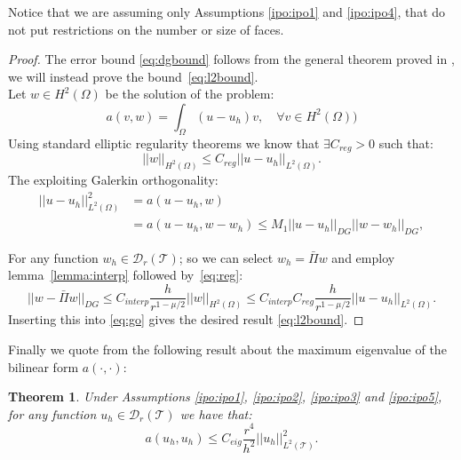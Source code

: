 \documentclass[12pt, a4paper]{article}
\theoremstyle{definition}
\theoremstyle{plain}
\theoremstyle{plain}
\newtheorem{teor}{Theorem}
\begin{document}
Notice that we are assuming only Assumptions \ref{ipo:ipo1} and \ref{ipo:ipo4}, that do not put restrictions on the number or size of faces.
\begin{proof}
	The error bound \eqref{eq:dgbound} follows from the general theorem proved in \cite{hpmet}, we will instead prove the bound~\eqref{eq:l2bound}.\\
	Let $w \in H^2(\Omega)$ be the solution of the problem:
	\begin{equation*}
		a(v, w) = \int_{\Omega} (u-u_h)v, \quad \forall v \in  H^2(\Omega))
	\end{equation*}
	Using standard elliptic regularity theorems we know that $\exists C_{reg}>0$ such that:
	\begin{equation} \label{eq:reg}
		|\!| w |\!|_{H^2(\Omega)} \leq C_{reg} |\!| u - u_h |\!|_{L^2(\Omega)}.
	\end{equation}
	The exploiting Galerkin orthogonality:
	\begin{equation} \label{eq:go}
	\begin{split}
		|\!| u - u_h |\!|^2_{L^2(\Omega)} &= a(u-u_h, w)\\
		&= a(u-u_h, w-w_h) \leq M_1 |\!| u - u_h |\!|_{DG} |\!| w - w_h |\!|_{DG},
	\end{split}
	\end{equation}

	For any function $w_h \in \mathcal{D}_r(\mathcal{T})$; so we can select $w_h = \bar{\Pi}w$ and employ lemma~\ref{lemma:interp} followed by~\eqref{eq:reg}:
	\begin{equation*}
		|\!|w-\bar{\Pi}w|\!|_{DG} \leq C_{interp} \frac{h}{r^{1-\mu/2}} |\!| w |\!|_{H^2(\Omega)} \leq C_{interp}C_{reg} \frac{h}{r^{1-\mu/2}} |\!| u-u_h |\!|_{L^2(\Omega)}.
	\end{equation*}
	Inserting this into \eqref{eq:go} gives the desired result \eqref{eq:l2bound}.
\end{proof}	
Finally we quote from \cite{multigrid} the following result about the maximum eigenvalue of the bilinear form $a(\cdot, \cdot)$:
\begin{teor}
	Under Assumptions \ref{ipo:ipo1}, \ref{ipo:ipo2}, \ref{ipo:ipo3} and \ref{ipo:ipo5}, for any function $u_h \in \mathcal{D}_r(\mathcal{T}) $ we have that:
	\begin{equation*}
		a(u_h, u_h) \leq C_{eig} \frac{r^4}{h^2} |\!| u_h |\!|^2_{L^2(\mathcal{T})}.
	\end{equation*}
\end{teor}
\end{document}
